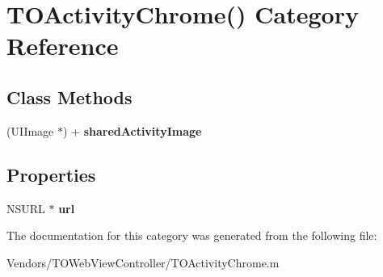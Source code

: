 \hypertarget{category_t_o_activity_chrome_07_08}{}\section{T\+O\+Activity\+Chrome() Category Reference}
\label{category_t_o_activity_chrome_07_08}
\subsection*{Class Methods}
\begin{DoxyCompactItemize}
\item 
\hypertarget{category_t_o_activity_chrome_07_08_ac31ba093357e62ce06ef1f0c41ae23f1}{}(U\+I\+Image $\ast$) + {\bfseries shared\+Activity\+Image}\label{category_t_o_activity_chrome_07_08_ac31ba093357e62ce06ef1f0c41ae23f1}

\end{DoxyCompactItemize}
\subsection*{Properties}
\begin{DoxyCompactItemize}
\item 
\hypertarget{category_t_o_activity_chrome_07_08_aa03f8c629f6ab7983b15c25d44d8b009}{}N\+S\+U\+R\+L $\ast$ {\bfseries url}\label{category_t_o_activity_chrome_07_08_aa03f8c629f6ab7983b15c25d44d8b009}

\end{DoxyCompactItemize}


The documentation for this category was generated from the following file\+:\begin{DoxyCompactItemize}
\item 
Vendors/\+T\+O\+Web\+View\+Controller/T\+O\+Activity\+Chrome.\+m\end{DoxyCompactItemize}
